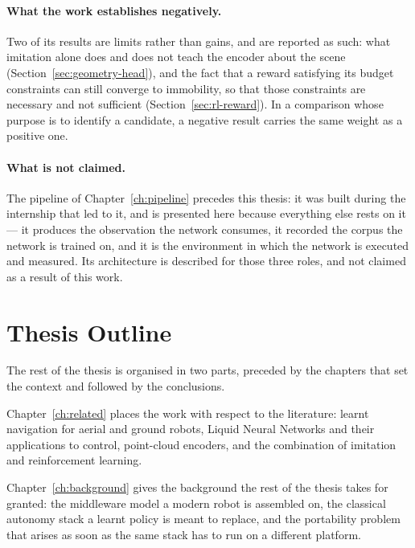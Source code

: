 \paragraph{What the work establishes negatively.}
Two of its results are limits rather than gains, and are reported as such: what
imitation alone does and does not teach the encoder about the scene
(Section~\ref{sec:geometry-head}), and the fact that a reward satisfying its
budget constraints can still converge to immobility, so that those constraints
are necessary and not sufficient (Section~\ref{sec:rl-reward}). In a comparison
whose purpose is to identify a candidate, a negative result carries the same
weight as a positive one.

\paragraph{What is not claimed.}
The pipeline of Chapter~\ref{ch:pipeline} precedes this thesis: it was built
during the internship that led to it, and is presented here because everything
else rests on it --- it produces the observation the network consumes, it
recorded the corpus the network is trained on, and it is the environment in
which the network is executed and measured. Its architecture is described for
those three roles, and not claimed as a result of this work.

\section{Thesis Outline}

The rest of the thesis is organised in two parts, preceded by the chapters that
set the context and followed by the conclusions.

Chapter~\ref{ch:related} places the work with respect to the literature:
learnt navigation for aerial and ground robots, Liquid Neural Networks and
their applications to control, point-cloud encoders, and the combination of
imitation and reinforcement learning.

Chapter~\ref{ch:background} gives the background the rest of the thesis takes
for granted: the middleware model a modern robot is assembled on, the classical
autonomy stack a learnt policy is meant to replace, and the portability problem
that arises as soon as the same stack has to run on a different platform.

